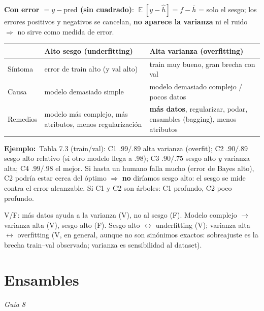 \documentclass[10pt,a4paper]{article}
\newcommand{\ej}{\textbf{\color{good}Ejemplo:}\ }
\newcommand{\guia}[1]{\hfill{\small\color{muted}\textit{Guía #1}}}
\DeclareMathOperator{\E}{\mathbb{E}}
\begin{document}
\textbf{Con error $=y-\text{pred}$ (sin cuadrado)}: $\E[y-\hat h]=f-\bar h$ = solo el sesgo; los errores positivos y negativos se cancelan, \textbf{no aparece la varianza} ni el ruido $\Rightarrow$ no sirve como medida de error.

\begin{center}\small
\begin{tabularx}{\linewidth}{@{}lXX@{}}
\toprule
& \textbf{Alto sesgo (underfitting)} & \textbf{Alta varianza (overfitting)}\\\midrule
Síntoma & error de train alto (y val alto) & train muy bueno, gran brecha con val\\
Causa & modelo demasiado simple & modelo demasiado complejo / pocos datos\\
Remedios & modelo más complejo, más atributos, menos regularización & \textbf{más datos}, regularizar, podar, ensambles (bagging), menos atributos\\
\bottomrule
\end{tabularx}
\end{center}
\begin{ejemplo}
\ej Tabla 7.3 (train/val): C1 $.99/.89$ alta varianza (overfit); C2 $.90/.89$ sesgo alto relativo (si otro modelo llega a .98); C3 $.90/.75$ sesgo alto \emph{y} varianza alta; C4 $.99/.98$ el mejor. Si hasta un humano falla mucho (error de Bayes alto), C2 podría estar cerca del óptimo $\Rightarrow$ \textbf{no} diríamos sesgo alto: el sesgo se mide contra el error alcanzable. Si C1 y C2 son árboles: C1 profundo, C2 poco profundo.
\end{ejemplo}
\begin{trampa}
V/F: más datos ayuda a la varianza (V), no al sesgo (F). Modelo complejo $\to$ varianza alta (V), sesgo alto (F). Sesgo alto $\leftrightarrow$ underfitting (V); varianza alta $\leftrightarrow$ overfitting (V, en general, aunque no son sinónimos exactos: sobreajuste es la brecha train–val observada; varianza es sensibilidad al dataset).
\end{trampa}

\section{Ensambles}\guia{8}
\end{document}
